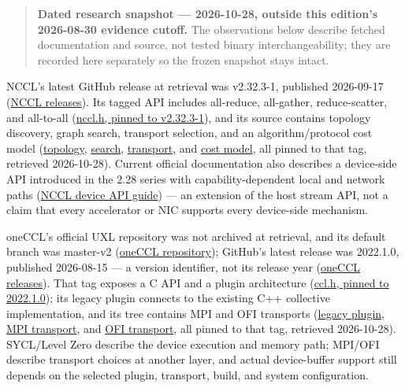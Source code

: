 \begin{quote}
\textbf{Dated research snapshot --- 2026-10-28, outside this edition's
2026-08-30 evidence cutoff.} The observations below describe fetched
documentation and source, not tested binary interchangeability; they are
recorded here separately so the frozen snapshot stays intact.
\end{quote}

NCCL's latest GitHub release at retrieval was v2.32.3-1, published
2026-09-17
(\href{https://api.github.com/repos/NVIDIA/nccl/releases/tags/v2.32.3-1}{NCCL
releases}). Its tagged API includes all-reduce, all-gather,
reduce-scatter, and all-to-all
(\href{https://raw.githubusercontent.com/NVIDIA/nccl/v2.32.3-1/src/nccl.h.in}{nccl.h,
pinned to v2.32.3-1}), and its source contains topology discovery, graph
search, transport selection, and an algorithm/protocol cost model
(\href{https://raw.githubusercontent.com/NVIDIA/nccl/v2.32.3-1/src/graph/topo.cc}{topology},
\href{https://raw.githubusercontent.com/NVIDIA/nccl/v2.32.3-1/src/graph/search.cc}{search},
\href{https://raw.githubusercontent.com/NVIDIA/nccl/v2.32.3-1/src/transport.cc}{transport},
and
\href{https://raw.githubusercontent.com/NVIDIA/nccl/v2.32.3-1/src/tuning/cost_model.cc}{cost
model}, all pinned to that tag, retrieved 2026-10-28). Current official
documentation also describes a device-side API introduced in the 2.28
series with capability-dependent local and network paths
(\href{https://docs.nvidia.com/deeplearning/nccl/user-guide/docs/usage/deviceapi.html}{NCCL
device API guide}) --- an extension of the host stream API, not a claim
that every accelerator or NIC supports every device-side mechanism.

oneCCL's official UXL repository was not archived at retrieval, and its
default branch was master-v2
(\href{https://api.github.com/repos/uxlfoundation/oneCCL}{oneCCL
repository}); GitHub's latest release was 2022.1.0, published 2026-08-15
--- a version identifier, not its release year
(\href{https://api.github.com/repos/uxlfoundation/oneCCL/releases/tags/2022.1.0}{oneCCL
releases}). That tag exposes a C API and a plugin architecture
(\href{https://raw.githubusercontent.com/uxlfoundation/oneCCL/2022.1.0/include/oneapi/ccl.h}{ccl.h,
pinned to 2022.1.0}); its legacy plugin connects to the existing C++
collective implementation, and its tree contains MPI and OFI transports
(\href{https://raw.githubusercontent.com/uxlfoundation/oneCCL/2022.1.0/plugins/legacy/ccl_legacy.cpp}{legacy
plugin},
\href{https://raw.githubusercontent.com/uxlfoundation/oneCCL/2022.1.0/deps/libccl/src/atl/mpi/atl_mpi.cpp}{MPI
transport}, and
\href{https://raw.githubusercontent.com/uxlfoundation/oneCCL/2022.1.0/deps/libccl/src/atl/ofi/atl_ofi.cpp}{OFI
transport}, all pinned to that tag, retrieved 2026-10-28). SYCL/Level
Zero describe the device execution and memory path; MPI/OFI describe
transport choices at another layer, and actual device-buffer support
still depends on the selected plugin, transport, build, and system
configuration.

